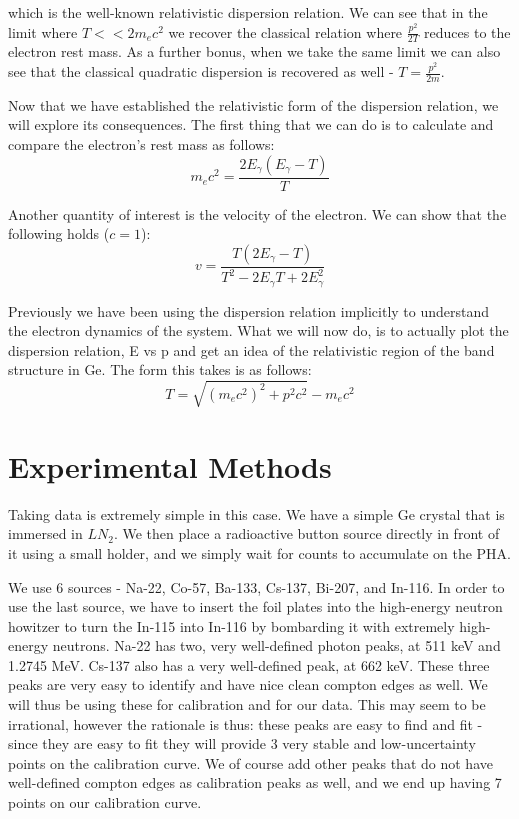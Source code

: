 \documentclass[reprint, nobibnotes, amssymb, amsmath, amsfonts, physics, mathtools, mathrsfs, floatfix]{revtex4-1}
\begin{document}
    which is the well-known relativistic dispersion relation.  We can see that in the limit where $T << 2m_ec^2$ we recover the classical relation where $\frac{p^2}{2T}$ reduces to the electron rest mass.  As a further bonus, when we take the same limit we can also see that the classical quadratic dispersion is recovered as well - $T = \frac{p^2}{2m}$.

    \hspace{.25cm}

    Now that we have established the relativistic form of the dispersion relation, we will explore its consequences.  The first thing that we can do is to calculate and compare the electron's rest mass as follows:
    \begin{equation}
      m_ec^2 = \frac{2E_\gamma(E_\gamma - T)}{T} \label{eq:rest_mass}
    \end{equation}

    Another quantity of interest is the velocity of the electron.  We can show that the following holds ($c = 1$):
    \begin{equation}
      v = \frac{T(2E_\gamma - T)}{T^2 - 2E_\gamma T + 2E_\gamma^2} \label{eq:velocity}
    \end{equation}

    Previously we have been using the dispersion relation implicitly to understand the electron dynamics of the system.  What we will now do, is to actually plot the dispersion relation, E vs p and get an idea of the relativistic region of the band structure in Ge.  The form this takes is as follows:
    \begin{equation}
      T = \sqrt{(m_ec^2)^2 + p^2c^2} - m_ec^2 \label{eq:dispersion}
    \end{equation}

  \section{Experimental Methods}
    Taking data is extremely simple in this case.  We have a simple Ge crystal that is immersed in $LN_2$.  We then place a radioactive button source directly in front of it using a small holder, and we simply wait for counts to accumulate on the PHA.

    \hspace{.25cm}

    We use 6 sources - Na-22, Co-57, Ba-133, Cs-137, Bi-207, and In-116.  In order to use the last source, we have to insert the foil plates into the high-energy neutron howitzer to turn the In-115 into In-116 by bombarding it with extremely high-energy neutrons.  Na-22 has two, very well-defined photon peaks, at 511 keV and 1.2745 MeV.  Cs-137 also has a very well-defined peak, at 662 keV.  These three peaks are very easy to identify and have nice clean compton edges as well.  We will thus be using these for calibration and for our data.  This may seem to be irrational, however the rationale is thus: these peaks are easy to find and fit - since they are easy to fit they will provide 3 very stable and low-uncertainty points on the calibration curve.  We of course add other peaks that do not have well-defined compton edges as calibration peaks as well, and we end up having 7 points on our calibration curve.
\end{document}
